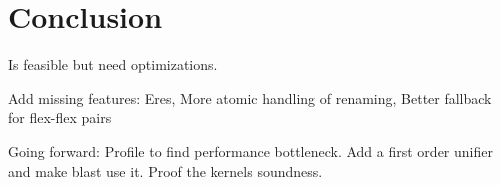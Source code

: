\chapter{Conclusion}\label{chapter:conclusion}

Is feasible but need optimizations.

Add missing features: Eres, More atomic handling of renaming, Better fallback for flex-flex pairs

Going forward: Profile to find performance bottleneck. Add a first order unifier and make blast use it. Proof the kernels soundness.